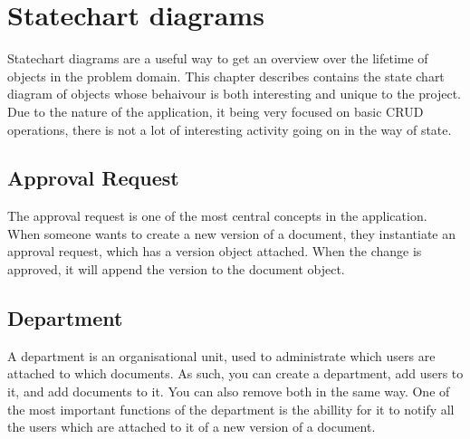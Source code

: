 \section{Statechart diagrams}
Statechart diagrams are a useful way to get an overview over the lifetime of objects in the problem domain.
This chapter describes contains the state chart diagram of objects whose behaivour is both interesting and unique to the project.
Due to the nature of the application, it being very focused on basic CRUD operations, there is not a lot of interesting activity going on in the way of state.
\subsection{Approval Request}
The approval request is one of the most central concepts in the application.
When someone wants to create a new version of a document, they instantiate an approval request, which has a version object attached.
When the change is approved, it will append the version to the document object.


\subsection{Department}
A department is an organisational unit, used to administrate which users are attached to which documents.
As such, you can create a department, add users to it, and add documents to it.
You can also remove both in the same way.
One of the most important functions of the department is the abillity for it to notify all the users which are attached to it of a new version of a document.

